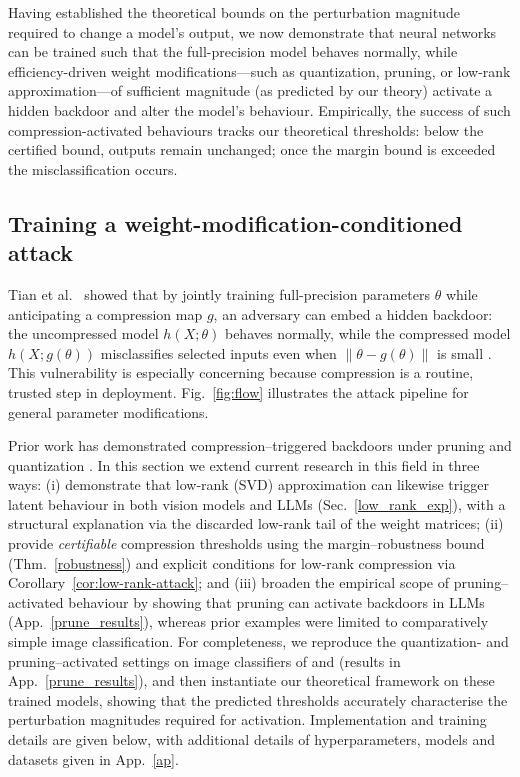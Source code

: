\documentclass{article}
\theoremstyle{plain}
\theoremstyle{definition}
\theoremstyle{remark}
\begin{document}
Having established the theoretical bounds on the perturbation magnitude required to change a model’s output, we now demonstrate that neural networks can be trained such that the full-precision model behaves normally, while efficiency-driven weight modifications—such as quantization, pruning, or low-rank approximation—of sufficient magnitude (as predicted by our theory) activate a hidden backdoor and alter the model’s behaviour. Empirically, the success of such compression-activated behaviours tracks our theoretical thresholds: below the certified bound, outputs remain unchanged; once the margin bound is exceeded the misclassification occurs.


\subsection{Training a weight-modification-conditioned attack}\label{train}

Tian et al.\ \cite{tian_stealthy_2021} showed that by jointly training full-precision parameters \(\theta\) while anticipating a compression map \(g\), an adversary can embed a hidden backdoor: the uncompressed model \(h(X;\theta)\) behaves normally, while the compressed model \(h(X;g(\theta))\) misclassifies selected inputs even when \(\|\theta-g(\theta)\|\) is small \cite{ma_quantization_2023}. This vulnerability is especially concerning because compression is a routine, trusted step in deployment. Fig.~\ref{fig:flow} illustrates the attack pipeline for general parameter modifications.



Prior work has demonstrated compression–triggered backdoors under pruning \cite{tian_stealthy_2021} and quantization \cite{hong_qu-anti-zation_2021,egashira_exploiting_2024}. 
In this section we extend current research in this field in three ways: (i) demonstrate that low-rank (SVD) approximation can likewise trigger latent behaviour in both vision models and LLMs (Sec.~\ref{low_rank_exp}), with a structural explanation via the discarded low-rank tail of the weight matrices; (ii) provide \emph{certifiable} compression thresholds using the margin–robustness bound (Thm.~\ref{robustness}) and explicit conditions for low-rank compression via Corollary~\ref{cor:low-rank-attack}; and (iii) broaden the empirical scope of pruning–activated behaviour by showing that pruning can activate backdoors in LLMs (App.~\ref{prune_results}), whereas prior examples were limited to comparatively simple image classification.  For completeness, we reproduce the quantization- and pruning–activated settings on image classifiers of \citet{tian_stealthy_2021} and \citet{hong_qu-anti-zation_2021} (results in App.~\ref{prune_results}), and then instantiate our theoretical framework on these trained models, showing that the predicted thresholds accurately characterise the perturbation magnitudes required for activation. Implementation and training details are given below, with additional details of hyperparameters, models and datasets given in App.~\ref{ap}.
\end{document}
